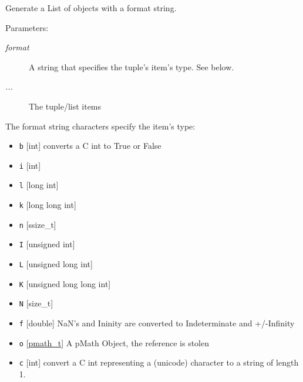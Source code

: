 Generate a List of objects with a format string. 

\begin{Desc}
\item[Parameters:]
\begin{description}
\item[{\em format}]A string that specifies the tuple's item's type. See below. \item[{\em ...}]The tuple/list items\end{description}
\end{Desc}
The format string characters specify the item's type:\begin{itemize}
\item {\tt b} \mbox{[}int\mbox{]} converts a C int to True or False\end{itemize}


\begin{itemize}
\item {\tt i} \mbox{[}int\mbox{]}\item {\tt l} \mbox{[}long int\mbox{]}\item {\tt k} \mbox{[}long long int\mbox{]}\item {\tt n} \mbox{[}ssize\_\-t\mbox{]}\end{itemize}


\begin{itemize}
\item {\tt I} \mbox{[}unsigned int\mbox{]}\item {\tt L} \mbox{[}unsigned long int\mbox{]}\item {\tt K} \mbox{[}unsigned long long int\mbox{]}\item {\tt N} \mbox{[}size\_\-t\mbox{]}\end{itemize}


\begin{itemize}
\item {\tt f} \mbox{[}double\mbox{]} NaN's and Ininity are converted to Indeterminate and +/-Infinity\end{itemize}


\begin{itemize}
\item {\tt o} \mbox{[}\hyperlink{classpmath__t}{pmath\_\-t}\mbox{]} A pMath Object, the reference is stolen\end{itemize}


\begin{itemize}
\item {\tt c} \mbox{[}int\mbox{]} convert a C int representing a (unicode) character to a string of length 1.\end{itemize}


